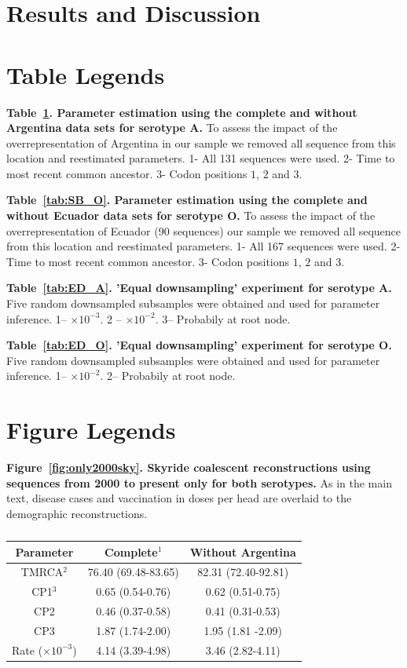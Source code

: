 \documentclass[a4paper,10pt]{article}
\begin{document}
\section{Results and Discussion}
\newpage
\section*{Table Legends}
\textbf{Table~\ref{tab:SB_A}. Parameter estimation using the complete and without Argentina data sets for serotype A.}
To assess the impact of the overrepresentation of Argentina in our sample we removed all sequence from this location and reestimated parameters.
1- All 131 sequences were used. 2- Time to most recent common ancestor. 3- Codon positions $1$, $2$ and $3$.

\textbf{Table~\ref{tab:SB_O}. Parameter estimation using the complete and without Ecuador data sets for serotype O.}
To assess the impact of the overrepresentation of Ecuador (90 sequences) our sample we removed all sequence from this location and reestimated parameters.
1- All 167 sequences were used. 2- Time to most recent common ancestor. 3- Codon positions $1$, $2$ and $3$.

\textbf{Table~\ref{tab:ED_A}. 'Equal downsampling' experiment for serotype A.}
Five random downsampled subsamples were obtained and used for parameter inference.
1-- $\times 10^{-3}$. 2 -- $\times 10^{-2}$. 3-- Probabily at root node. 

\textbf{Table~\ref{tab:ED_O}. 'Equal downsampling' experiment for serotype O.}
Five random downsampled subsamples were obtained and used for parameter inference.
1-- $\times 10^{-2}$. 2--  Probabily at root node.

\newpage
\section*{Figure Legends}

\textbf{Figure~\ref{fig:only2000sky}. Skyride coalescent reconstructions using sequences from 2000 to present only for both serotypes.}
As in the main text, disease cases and vaccination in doses per head are overlaid to the demographic reconstructions.

\newpage

\newpage 

\begin{center}
\begin{table}[h]
\caption{}
\begin{tabular}{ccc}
\toprule
Parameter	&Complete$^{1}$	&Without Argentina\\
\midrule
TMRCA$^{2}$	&76.40 (69.48-83.65)	&82.31 (72.40-92.81)\\
CP1$	^{3}$	&0.65 (0.54-0.76)	&0.62 (0.51-0.75)\\
CP2	&0.46 (0.37-0.58)	&0.41 (0.31-0.53)\\
CP3	&1.87 (1.74-2.00)	& 1.95 (1.81 -2.09)\\
Rate ($\times 10^{-3}$)	&4.14 (3.39-4.98)	&3.46 (2.82-4.11)\\
\bottomrule
\end{tabular}
\label{tab:SB_A}
 \end{table}
\end{center}
\end{document}
